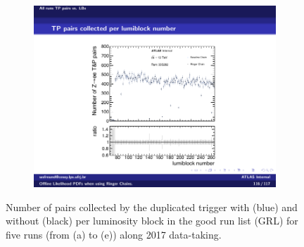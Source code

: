 \begin{figure}[b]
\begin{subfigure}[c]{.30\textwidth}
\includegraphics[width=\textwidth]{appendices/figures/pairs_wrt_lb/run335282}%
\caption{\label{fig:run335282}}
\end{subfigure}
\caption{\label{fig:tap_pairs_count}
Number of \Zee{} \tnp{} pairs collected by the duplicated trigger with (blue)
and without (black) \rnn{} per luminosity block in the good run list (GRL)
for five runs (from (a) to (e)) along 2017 data-taking.
}
\end{figure}

